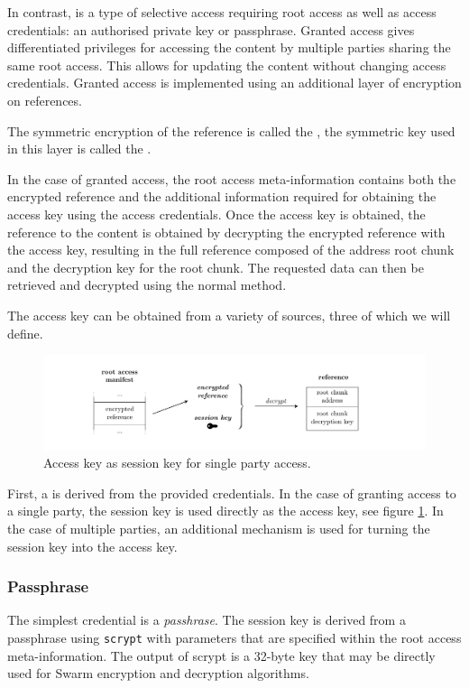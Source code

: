 In contrast,  is a type of selective access requiring root access as well as access credentials: an authorised private key or passphrase. Granted access gives differentiated privileges for accessing the content by multiple parties sharing the same root access. This allows for updating the content without changing access credentials. Granted access is implemented using an additional layer of encryption on references.

The symmetric encryption of the reference is called the , the symmetric key used in this layer is called the .

In the case of granted access, the root access meta-information contains both the encrypted reference and the additional information required for obtaining the access key using the access credentials. Once the access key is obtained, the reference to the content is obtained by decrypting the encrypted reference with the access key, resulting in the full reference composed of the address root chunk and the decryption key for the root chunk. The requested data can then be retrieved and decrypted using the normal method.

The access key can be obtained from a variety of sources, three of which we will define.

\begin{figure}[htbp]
\centering
\includegraphics[width=\textwidth]{fig/access-control-single-party.pdf}
\caption[Access key as session key for single party access  \statusyellow]{Access key as session key for single party access.}
\label{fig:access-control-single-party}
\end{figure}

First, a  is derived from the provided credentials. In the case of granting access to a single party, the session key is used directly as the access key, see figure \ref{fig:access-control-single-party}. In the case of multiple parties, an additional mechanism is used for turning the session key into the access key.

\subsubsection{Passphrase}
The simplest credential is a \emph{passhrase}. The session key is derived from a passphrase using \lstinline{scrypt} with parameters that are specified within the root access meta-information. The output of scrypt is a 32-byte key that may be directly used for Swarm encryption and decryption algorithms.

